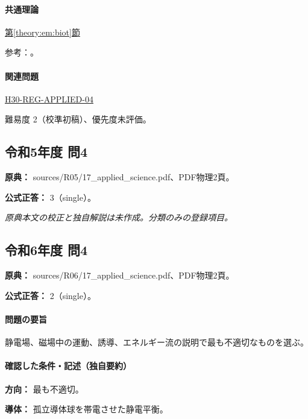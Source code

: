 \paragraph{共通理論} \hyperref[theory:em:biot]{第\ref*{theory:em:biot}節}

\par 参考：\cite{mit_em09}。

\paragraph{関連問題} \hyperref[q:h30-reg-applied-04]{H30-REG-APPLIED-04}

\par 難易度 2（校準初稿）、優先度未評価。

\subsection{令和5年度 問4}
\label{q:r05-reg-applied-04}

\noindent\textbf{原典：} sources/R05/17\_applied\_science.pdf、PDF物理2頁。

\textbf{公式正答：} 3（single）。

\par\textit{原典本文の校正と独自解説は未作成。分類のみの登録項目。}

\subsection{令和6年度 問4}
\label{q:r06-reg-applied-04}

\noindent\textbf{原典：} sources/R06/17\_applied\_science.pdf、PDF物理2頁。

\textbf{公式正答：} 2（single）。

\paragraph{問題の要旨} 静電場、磁場中の運動、誘導、エネルギー流の説明で最も不適切なものを選ぶ。

\paragraph{確認した条件・記述（独自要約）}\mbox{}\par

\noindent\textbf{方向：} 最も不適切。\par

\noindent\textbf{導体：} 孤立導体球を帯電させた静電平衡。\par

